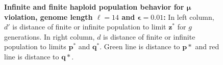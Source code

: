\begin{figure}[h]
\begin{center}
\hspace{-3em}%
\vspace{-0.5em} \hspace{-3em}%
\caption[\textbf{Infinite and finite haploid population behavior for $\bm{\mu}$ violation, genome length $\ell = 14$ and $\bm{\epsilon} = 0.01$}]{\textbf{Infinite and finite haploid population behavior for $\bm{\mu}$ violation, genome length $\ell = 14$ and $\bm{\epsilon} = 0.01$:} 
  In left column, $d'$ is distance of finite or infinite population to limit $\bm{z}^\ast$ for $g$ generations. In right column, $d$ is distance of finite or infinite population to limits $\bm{p}^\ast$ and $\bm{q}^\ast$. Green line is distance to $\bm{p*}$ and red line is distance to $\bm{q*}$.}
\label{oscillation_14h_vio_mu_0.01}
\end{center}
\end{figure}

